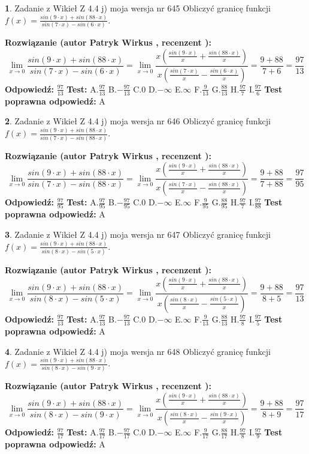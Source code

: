 \documentclass[12pt, a4paper]{article}
\theoremstyle{definition} %
\newtheorem{zad}{}
\newcommand{\zadStart}[1]{\begin{zad}#1\newline}
\newcommand{\zadStop}{\end{zad}}
\newcommand{\rozwStart}[2]{\noindent \textbf{Rozwiązanie (autor #1 , recenzent #2): }\newline}
\newcommand{\rozwStop}{\newline}
\newcommand{\odpStart}{\noindent \textbf{Odpowiedź:}\newline}
\newcommand{\odpStop}{\newline}
\newcommand{\testStart}{\noindent \textbf{Test:}\newline}
\newcommand{\testStop}{\newline}
\newcommand{\kluczStart}{\noindent \textbf{Test poprawna odpowiedź:}\newline}
\newcommand{\kluczStop}{\newline}
\begin{document}
\zadStart{Zadanie z Wikieł Z 4.4 j) moja wersja nr 645}
Obliczyć granicę funkcji $f(x)=\frac{sin(9\cdot x) +sin(88\cdot x)}{sin(7\cdot x) -sin(6\cdot x)}$.
\zadStop
\rozwStart{Patryk Wirkus}{}
$$\lim\limits_{x\to 0}\frac{sin(9\cdot x) +sin(88\cdot x)}{sin(7\cdot x) -sin(6\cdot x)}=\lim\limits_{x\to 0}\frac{x(\frac{sin(9\cdot x)}{x}+\frac{sin(88\cdot x)}{x})}{x(\frac{sin(7\cdot x)}{x}-\frac{sin(6\cdot x)}{x})}=\frac{9+88}{7+6} = \frac{97}{13}$$
\rozwStop
\odpStart
$\frac{97}{13}$
\odpStop
\testStart
A.$\frac{97}{13}$
B.$-\frac{97}{13}$
C.$0$
D.$-\infty$
E.$\infty$
F.$\frac{9}{13}$
G.$\frac{88}{13}$
H.$\frac{97}{7}$
I.$\frac{97}{6}$
\testStop
\kluczStart
A
\kluczStop



\zadStart{Zadanie z Wikieł Z 4.4 j) moja wersja nr 646}
Obliczyć granicę funkcji $f(x)=\frac{sin(9\cdot x) +sin(88\cdot x)}{sin(7\cdot x) -sin(88\cdot x)}$.
\zadStop
\rozwStart{Patryk Wirkus}{}
$$\lim\limits_{x\to 0}\frac{sin(9\cdot x) +sin(88\cdot x)}{sin(7\cdot x) -sin(88\cdot x)}=\lim\limits_{x\to 0}\frac{x(\frac{sin(9\cdot x)}{x}+\frac{sin(88\cdot x)}{x})}{x(\frac{sin(7\cdot x)}{x}-\frac{sin(88\cdot x)}{x})}=\frac{9+88}{7+88} = \frac{97}{95}$$
\rozwStop
\odpStart
$\frac{97}{95}$
\odpStop
\testStart
A.$\frac{97}{95}$
B.$-\frac{97}{95}$
C.$0$
D.$-\infty$
E.$\infty$
F.$\frac{9}{95}$
G.$\frac{88}{95}$
H.$\frac{97}{7}$
I.$\frac{97}{88}$
\testStop
\kluczStart
A
\kluczStop



\zadStart{Zadanie z Wikieł Z 4.4 j) moja wersja nr 647}
Obliczyć granicę funkcji $f(x)=\frac{sin(9\cdot x) +sin(88\cdot x)}{sin(8\cdot x) -sin(5\cdot x)}$.
\zadStop
\rozwStart{Patryk Wirkus}{}
$$\lim\limits_{x\to 0}\frac{sin(9\cdot x) +sin(88\cdot x)}{sin(8\cdot x) -sin(5\cdot x)}=\lim\limits_{x\to 0}\frac{x(\frac{sin(9\cdot x)}{x}+\frac{sin(88\cdot x)}{x})}{x(\frac{sin(8\cdot x)}{x}-\frac{sin(5\cdot x)}{x})}=\frac{9+88}{8+5} = \frac{97}{13}$$
\rozwStop
\odpStart
$\frac{97}{13}$
\odpStop
\testStart
A.$\frac{97}{13}$
B.$-\frac{97}{13}$
C.$0$
D.$-\infty$
E.$\infty$
F.$\frac{9}{13}$
G.$\frac{88}{13}$
H.$\frac{97}{8}$
I.$\frac{97}{5}$
\testStop
\kluczStart
A
\kluczStop



\zadStart{Zadanie z Wikieł Z 4.4 j) moja wersja nr 648}
Obliczyć granicę funkcji $f(x)=\frac{sin(9\cdot x) +sin(88\cdot x)}{sin(8\cdot x) -sin(9\cdot x)}$.
\zadStop
\rozwStart{Patryk Wirkus}{}
$$\lim\limits_{x\to 0}\frac{sin(9\cdot x) +sin(88\cdot x)}{sin(8\cdot x) -sin(9\cdot x)}=\lim\limits_{x\to 0}\frac{x(\frac{sin(9\cdot x)}{x}+\frac{sin(88\cdot x)}{x})}{x(\frac{sin(8\cdot x)}{x}-\frac{sin(9\cdot x)}{x})}=\frac{9+88}{8+9} = \frac{97}{17}$$
\rozwStop
\odpStart
$\frac{97}{17}$
\odpStop
\testStart
A.$\frac{97}{17}$
B.$-\frac{97}{17}$
C.$0$
D.$-\infty$
E.$\infty$
F.$\frac{9}{17}$
G.$\frac{88}{17}$
H.$\frac{97}{8}$
I.$\frac{97}{9}$
\testStop
\kluczStart
A
\kluczStop
\end{document}
